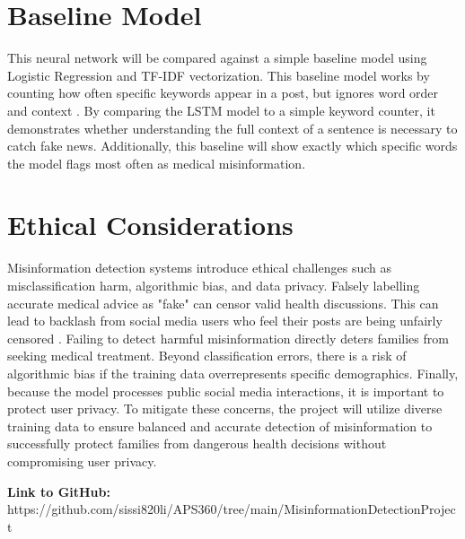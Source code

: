 \documentclass[final]{article}
\begin{document}
\section*{Baseline Model}
This neural network will be compared against a simple baseline model using Logistic Regression and TF-IDF vectorization. This baseline model works by counting how often specific keywords appear in a post, but ignores word order and context \cite{ekoh_sentiment_baseline}. By comparing the LSTM model to a simple keyword counter, it demonstrates whether understanding the full context of a sentence is necessary to catch fake news. Additionally, this baseline will show exactly which specific words the model flags most often as medical misinformation. 
\section*{Ethical Considerations}
Misinformation detection systems introduce ethical challenges such as misclassification harm, algorithmic bias, and data privacy. Falsely labelling accurate medical advice as "fake" can censor valid health discussions. This can lead to backlash from social media users who feel their posts are being unfairly censored \cite{9253994}. Failing to detect harmful misinformation directly deters families from seeking medical treatment. Beyond classification errors, there is a risk of algorithmic bias if the training data overrepresents specific demographics. Finally, because the model processes public social media interactions, it is important to protect user privacy. To mitigate these concerns, the project will utilize diverse training data to ensure balanced and accurate detection of misinformation to successfully protect families from dangerous health decisions without compromising user privacy.

\textbf{Link to GitHub:} https://github.com/sissi820li/APS360/tree/main/MisinformationDetectionProject

\newpage
\cite{padalko2024novel}
\cite{chen2021characteristics}
\cite{zubiaga2018detection}
\cite{liu2019analysis}
\cite{lokhande2023fake}
\cite{arashnic_covid19_fakenews}
\cite{kumar_fake_news}
\cite{10370534}
\cite{ekoh_sentiment_baseline}
\cite{9253994}


\end{document}
